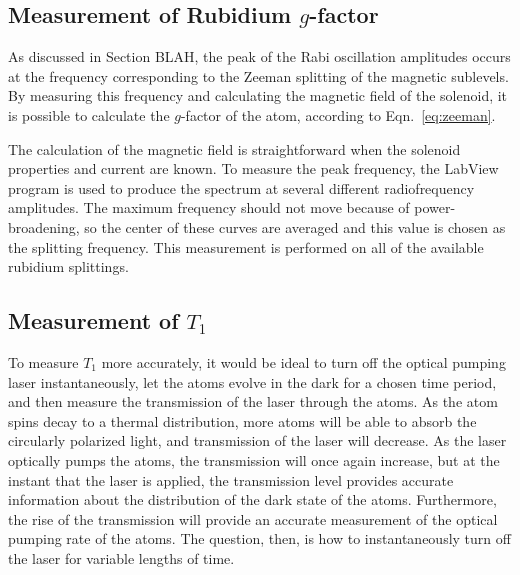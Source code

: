 \subsection{Measurement of Rubidium $g$-factor}

As discussed in Section BLAH, the peak of the Rabi oscillation amplitudes occurs at the frequency corresponding to the Zeeman splitting of the magnetic sublevels. By measuring this frequency and calculating the magnetic field of the solenoid, it is possible to calculate the $g$-factor of the atom, according to Eqn.~\ref{eq:zeeman}.

The calculation of the magnetic field is straightforward when the solenoid properties and current are known. To measure the peak frequency, the LabView program is used to produce the spectrum at several different radiofrequency amplitudes. The maximum frequency should not move because of power-broadening, so the center of these curves are averaged and this value is chosen as the splitting frequency. This measurement is performed on all of the available rubidium splittings.

\subsection{Measurement of $T_{1}$}\label{measurementoft1}

To measure $T_{1}$ more accurately, it would be ideal to turn off the optical pumping laser instantaneously, let the atoms evolve in the dark for a chosen time period, and then measure the transmission of the laser through the atoms. \cite{franzen} As the atom spins decay to a thermal distribution, more atoms will be able to absorb the circularly polarized light, and transmission of the laser will decrease. As the laser optically pumps the atoms, the transmission will once again increase, but at the instant that the laser is applied, the transmission level provides accurate information about the distribution of the dark state of the atoms. Furthermore, the rise of the transmission will provide an accurate measurement of the optical pumping rate of the atoms. The question, then, is how to instantaneously turn off the laser for variable lengths of time.

